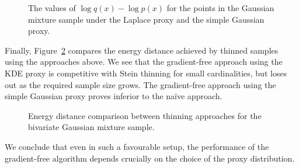 \documentclass[11pt,a4paper]{report}
\begin{document}
\begin{figure}[h]
\centering
{}
\caption{The values of $\log q(x) - \log p(x)$ for the points in the Gaussian mixture sample under the Laplace proxy and the simple Gaussian proxy.
\label{fig:gmm:laplace-failure}}
\end{figure}

Finally, Figure~\ref{fig:gmm:comparison} compares the energy distance achieved by thinned samples using the approaches above. We see that the gradient-free approach using the KDE proxy is competitive with Stein thinning for small cardinalities, but loses out as the required sample size grows. The gradient-free approach using the simple Gaussian proxy proves inferior to the na\"ive approach.

\begin{figure}[h]
\centering
{}
\caption{Energy distance comparison between thinning approaches for the bivariate Gaussian mixture sample.
\label{fig:gmm:comparison}}
\end{figure}

We conclude that even in such a favourable setup, the performance of the gradient-free algorithm depends crucially on the choice of the proxy distribution.
\end{document}
